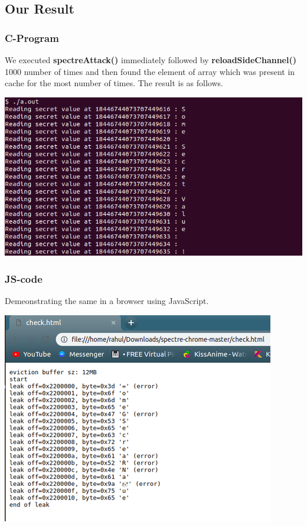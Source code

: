 \documentclass[12pt]{article}
\begin{document}
  \newpage
\subsection{Our Result}

\subsubsection{C-Program}
We executed \textbf{spectreAttack()} immediately followed by \textbf{reloadSideChannel()} 1000 number of times and then found the element of array which was present in cache for the most number of times. The result is as follows.

\vspace*{0.0 cm}
	{\centering
    \vspace*{0.0 cm}
\includegraphics[scale = 0.45]{spectre.png}\\[1.0 cm]}
\subsubsection{JS-code\cite{GITHUB_LINK}}
Demeonstrating the same in a browser using JavaScript.

\vspace*{0.0 cm}
	{\centering
    \vspace*{0.5 cm}
\includegraphics[scale = 0.6]{spectre_javascript.png}\\[1.0 cm]}
\end{document}
